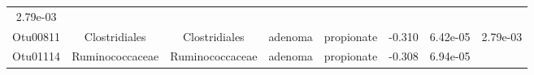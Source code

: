 \documentclass[11pt,]{article}
\begin{document}
\begin{longtable}[]{@{}cccccccc@{}}
\begin{minipage}[t]{0.08\columnwidth}
2.79e-03\strut
\end{minipage}\tabularnewline
\begin{minipage}[t]{0.08\columnwidth}\centering\strut
Otu00811\strut
\end{minipage} & \begin{minipage}[t]{0.15\columnwidth}\centering\strut
Clostridiales\strut
\end{minipage} & \begin{minipage}[t]{0.15\columnwidth}\centering\strut
Clostridiales\strut
\end{minipage} & \begin{minipage}[t]{0.08\columnwidth}\centering\strut
adenoma\strut
\end{minipage} & \begin{minipage}[t]{0.09\columnwidth}\centering\strut
propionate\strut
\end{minipage} & \begin{minipage}[t]{0.07\columnwidth}\centering\strut
-0.310\strut
\end{minipage} & \begin{minipage}[t]{0.08\columnwidth}\centering\strut
6.42e-05\strut
\end{minipage} & \begin{minipage}[t]{0.08\columnwidth}\centering\strut
2.79e-03\strut
\end{minipage}\tabularnewline
\begin{minipage}[t]{0.08\columnwidth}\centering\strut
Otu01114\strut
\end{minipage} & \begin{minipage}[t]{0.15\columnwidth}\centering\strut
Ruminococcaceae\strut
\end{minipage} & \begin{minipage}[t]{0.15\columnwidth}\centering\strut
Ruminococcaceae\strut
\end{minipage} & \begin{minipage}[t]{0.08\columnwidth}\centering\strut
adenoma\strut
\end{minipage} & \begin{minipage}[t]{0.09\columnwidth}\centering\strut
propionate\strut
\end{minipage} & \begin{minipage}[t]{0.07\columnwidth}\centering\strut
-0.308\strut
\end{minipage} & \begin{minipage}[t]{0.08\columnwidth}\centering\strut
6.94e-05\strut
\end{minipage} & \begin{minipage}[t]{0.08\columnwidth}\centering\strut

\end{minipage}
\end{longtable}
\end{document}
